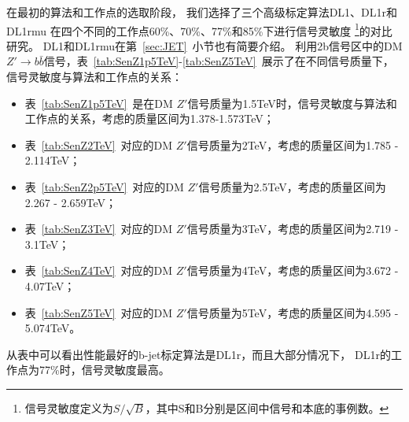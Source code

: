 在最初的算法和工作点的选取阶段，
我们选择了三个高级标定算法DL1、DL1r和DL1rmu
在四个不同的工作点60\%、70\%、77\%和85\%下进行信号灵敏度
\footnote{信号灵敏度定义为$S/\sqrt{B}$，其中S和B分别是区间中信号和本底的事例数。}的对比研究。
DL1和DL1rmu在第~\ref{sec:JET}~小节也有简要介绍。
利用2b信号区中的DM $Z\prime \to b\bar{b}$信号，表~\ref{tab:SenZ1p5TeV}-\ref{tab:SenZ5TeV}~展示了在不同信号质量下，
信号灵敏度与算法和工作点的关系：
\begin{itemize}
        \item 表~\ref{tab:SenZ1p5TeV}~是在DM $Z\prime$信号质量为1.5TeV时，信号灵敏度与算法和工作点的关系，考虑的质量区间为1.378-1.573TeV；
       \item 表~\ref{tab:SenZ2TeV}~对应的DM $Z\prime$信号质量为2TeV，考虑的质量区间为1.785 - 2.114TeV；
	\item 表~\ref{tab:SenZ2p5TeV}~对应的DM $Z\prime$信号质量为2.5TeV，考虑的质量区间为2.267 - 2.659TeV；
	\item 表~\ref{tab:SenZ3TeV}~对应的DM $Z\prime$信号质量为3TeV，考虑的质量区间为2.719 - 3.1TeV；
	\item 表~\ref{tab:SenZ4TeV}~对应的DM $Z\prime$信号质量为4TeV，考虑的质量区间为3.672 - 4.07TeV；
	\item 表~\ref{tab:SenZ5TeV}~对应的DM $Z\prime$信号质量为5TeV，考虑的质量区间为4.595 - 5.074TeV。
\end{itemize}
从表中可以看出性能最好的b-jet标定算法是DL1r，而且大部分情况下，
DL1r的工作点为77\%时，信号灵敏度最高。


